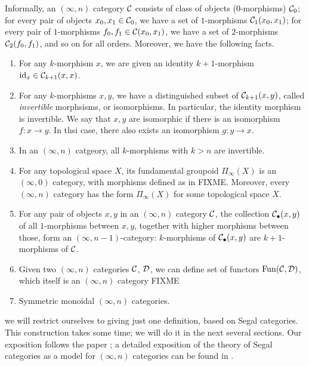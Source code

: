 Informally, an $(\infty, n)$ category $\mathcal{C}$ consists of class of  objects
(0-morphisms) $\mathcal{C}_0$; for every pair of objects $x_0, x_1\in \mathcal{C}_0$, we
have a set of $1$-morphisms $\mathcal{C}_1(x_0, x_1)$; for every pair of
$1$-morphisms $f_0, f_1\in \mathcal{C}(x_0,x_1)$, we have a set of $2$-morphisms
$\mathcal{C}_2(f_0,f_1)$, and so on for all orders. Moreover, we have the following
facts.

\begin{enumerate}
  \item For any $k$-morphism $x$, we are given an identity  $k+1$-morphism
    $\operatorname{id}_x \in \mathcal{C}_{k+1}(x,x)$.
  \item For any $k$-morphisms $x,y$, we have a distinguished subset of
    $\mathcal{C}_{k+1}(x,y)$, called \emph{invertible} morphsisms, or isomorphisms. In
    particular, the identity morphism is invertible. We say that $x,y$ are
    isomorphic if there is an isomorphism $f\colon x\to y$. In thsi case, there
    also exists an isomorphism $g\colon y\to x$.
  \item In an $(\infty, n)$ catgeory, all $k$-morphisms with $k>n$ are
    invertible.
  \item For any topological space $X$, its fundamental groupoid $\Pi_\infty(X)$
    is an $(\infty, 0)$ category, with morphisms defined as in FIXME. Moreover,
    every $(\infty, n)$ category has the form $\Pi_\infty(X)$ for some
    topological space $X$.
  \item For any pair of objects $x,y$ in an $(\infty, n)$ category   $\mathcal{C}$,
    the collection $\mathcal{C}_\bullet(x,y)$ of all $1$-morphisms between $x,y$,
    together with higher morphisms between those, form an $(\infty,
    n-1)$-category: $k$-morphisms of $\mathcal{C}_\bullet(x,y)$ are $k+1$-morphisms
    of $\mathcal{C}$.
  \item Given two $(\infty, n)$ categories $\mathcal{C}$, $\mathcal{D}$, we can define
    set of functors $\operatorname{Fun}(\mathcal{C}, \mathcal{D})$, which itself is an $(\infty, n)$
    category FIXME
  \item Symmetric monoidal $(\infty, n)$ categories.
\end{enumerate}


 we will
restrict ourselves to giving just one definition, based on Segal categories.
This construction takes some time; we will do it in the next several sections.
Our exposition follows the paper ; a detailed
exposition of the theory of Segal categories as a model for $(\infty, n)$
categories can be found in .




